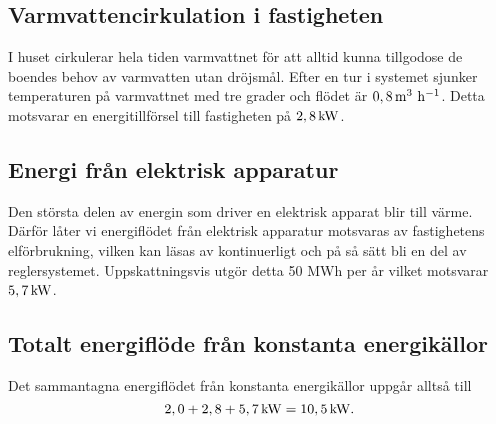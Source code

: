 \subsection{Varmvattencirkulation i fastigheten}
I huset cirkulerar hela tiden varmvattnet för att alltid kunna tillgodose de boendes behov av varmvatten utan dröjsmål. Efter en tur i systemet sjunker temperaturen på varmvattnet med tre grader och flödet är $\unit[0,8]{m^3~h^{-1}}$. Detta motsvarar en energitillförsel till fastigheten på $\unit[2,8]{kW}$.

\subsection{Energi från elektrisk apparatur}
Den största delen av energin som driver en elektrisk apparat blir till värme. Därför låter vi energiflödet från elektrisk apparatur motsvaras av fastighetens elförbrukning, vilken kan läsas av kontinuerligt och på så sätt bli en del av reglersystemet. Uppskattningsvis utgör detta 50 MWh per år vilket motsvarar $\unit[5,7]{kW}$.

\subsection{Totalt energiflöde från konstanta energikällor}
Det sammantagna energiflödet från konstanta energikällor uppgår alltså till 
\begin{equation}
\unit[2,0+2,8+5,7]{kW} =\unit[10,5]{kW}.
\end{equation}


